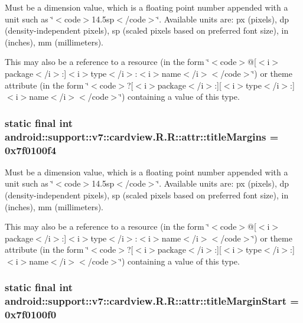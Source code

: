 Must be a dimension value, which is a floating point number appended with a unit such as \char`\"{}$<$code$>$14.5sp$<$/code$>$\char`\"{}. Available units are: px (pixels), dp (density-independent pixels), sp (scaled pixels based on preferred font size), in (inches), mm (millimeters). 

This may also be a reference to a resource (in the form \char`\"{}$<$code$>$@\mbox{[}$<$i$>$package$<$/i$>$:\mbox{]}$<$i$>$type$<$/i$>$:$<$i$>$name$<$/i$>$$<$/code$>$\char`\"{}) or theme attribute (in the form \char`\"{}$<$code$>$?\mbox{[}$<$i$>$package$<$/i$>$:\mbox{]}\mbox{[}$<$i$>$type$<$/i$>$:\mbox{]}$<$i$>$name$<$/i$>$$<$/code$>$\char`\"{}) containing a value of this type. \hypertarget{classandroid_1_1support_1_1v7_1_1cardview_1_1_r_1_1attr_a1e50d0424eb5d4424860ff9e480bb33}{
\subsubsection[{titleMargins}]{\setlength{\rightskip}{0pt plus 5cm}static final int android::support::v7::cardview.R.R::attr::titleMargins = 0x7f0100f4}}
\label{classandroid_1_1support_1_1v7_1_1cardview_1_1_r_1_1attr_a1e50d0424eb5d4424860ff9e480bb33}


Must be a dimension value, which is a floating point number appended with a unit such as \char`\"{}$<$code$>$14.5sp$<$/code$>$\char`\"{}. Available units are: px (pixels), dp (density-independent pixels), sp (scaled pixels based on preferred font size), in (inches), mm (millimeters). 

This may also be a reference to a resource (in the form \char`\"{}$<$code$>$@\mbox{[}$<$i$>$package$<$/i$>$:\mbox{]}$<$i$>$type$<$/i$>$:$<$i$>$name$<$/i$>$$<$/code$>$\char`\"{}) or theme attribute (in the form \char`\"{}$<$code$>$?\mbox{[}$<$i$>$package$<$/i$>$:\mbox{]}\mbox{[}$<$i$>$type$<$/i$>$:\mbox{]}$<$i$>$name$<$/i$>$$<$/code$>$\char`\"{}) containing a value of this type. \hypertarget{classandroid_1_1support_1_1v7_1_1cardview_1_1_r_1_1attr_81027be51518d3bdb3f708eb5bd96842}{
\subsubsection[{titleMarginStart}]{\setlength{\rightskip}{0pt plus 5cm}static final int android::support::v7::cardview.R.R::attr::titleMarginStart = 0x7f0100f0}}
\label{classandroid_1_1support_1_1v7_1_1cardview_1_1_r_1_1attr_81027be51518d3bdb3f708eb5bd96842}


